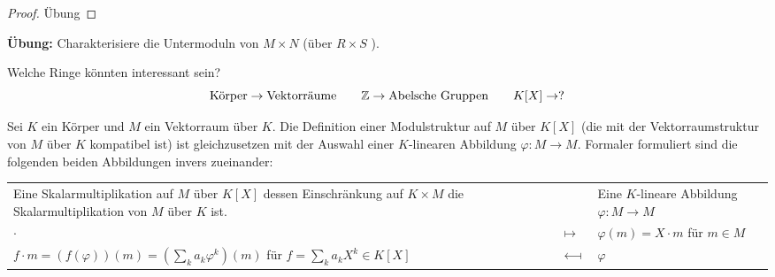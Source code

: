 \begin{proof}
	Übung
\end{proof}

\textbf{Übung:}
Charakterisiere die Untermoduln von $M \times N$ (über $R \times S$ ).

Welche Ringe könnten interessant sein?
\[
	\text{Körper} \to \text{Vektorräume} \qquad \mathbb{Z} \to \text{Abelsche Gruppen} \qquad K[X] \to ?
\] 
\begin{theorem}
	Sei $K$ ein Körper und $M$ ein Vektorraum über $K$.
	Die Definition einer Modulstruktur auf $M$ über $K[X]$ (die mit der Vektorraumstruktur von $M$ über $K$ kompatibel ist)
	ist gleichzusetzen mit der Auswahl einer $K$-linearen Abbildung $\varphi: M \to M$.
	Formaler formuliert sind die folgenden beiden Abbildungen invers zueinander:
	\begin{center}
		\begin{tabu} to \linewidth {X[2] X[0.2] X[2]}
			Eine Skalarmultiplikation auf $M$ über $K[X]$ dessen Einschränkung auf $K \times M$ die Skalarmultiplikation von $M$ über $K$ ist. & & 
			Eine $K$-lineare Abbildung $ \varphi: M \to M$ \\
			\qquad \qquad \qquad \qquad \qquad  $\cdot $ & $\longmapsto $ & $\varphi(m) = X \cdot m$ für $m \in M$ \\
			$f \cdot m = (f(\varphi))(m) = (\sum_{k} a_{k} \varphi^{k}) (m)$ für $f = \sum_{k} a_{k} X^{k} \in K[X]$ & $\longmapsfrom$ & $\varphi$
		\end{tabu}
	\end{center}
\end{theorem}


